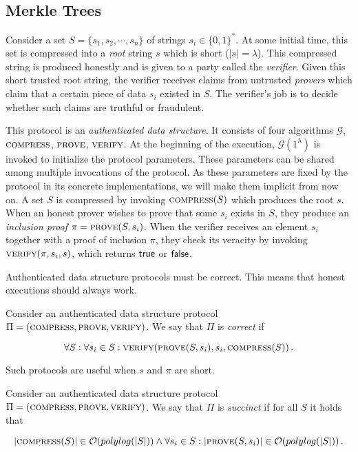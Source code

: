 \subsection{Merkle Trees}
Consider a set $S = \{s_1, s_2, \cdots, s_n\}$ of strings
$s_i \in \{0, 1\}^*$. At some initial time, this set is compressed into a
\emph{root} string $s$ which is short ($|s| = \lambda$). This compressed string
is produced honestly and is given to a party called the \emph{verifier}. Given
this short trusted root string, the verifier receives claims from untrusted
\emph{provers} which claim that a certain piece of data $s_i$ existed in $S$.
The verifier's job is to decide whether such claims are truthful or fraudulent.

This protocol is an \emph{authenticated data structure}. It consists of
four algorithms $\mathcal{G}$, $\textsc{compress}$, $\textsc{prove}$,
$\textsc{verify}$. At the beginning of the execution, $\mathcal{G}(1^\lambda)$
is invoked to initialize the protocol parameters. These parameters can be shared
among multiple invocations of the protocol. As these parameters are fixed by the
protocol in its concrete implementations, we will make them implicit from now
on. A set $S$ is compressed by invoking $\textsc{compress}(S)$
which produces the root $s$. When an honest prover wishes to prove that some
$s_i$ exists in $S$, they produce an \emph{inclusion proof} $\pi =
\textsc{prove}(S, s_i)$. When the verifier receives an element $s_i$ together
with a proof of inclusion $\pi$, they check its veracity by invoking
$\textsc{verify}(\pi, s_i, s)$, which returns $\textsf{true}$ or $\textsf{false}$.

Authenticated data structure protocols must be correct. This means that honest
executions should always work.

\begin{definition}[Correctness]
  Consider an authenticated data structure protocol
  $\Pi = (\textsc{compress}, \textsc{prove}, \textsc{verify})$.
  We say that $\Pi$ is
  \emph{correct} if

  \[\forall S:
    \forall s_i \in S:
    \textsc{verify}(\textsc{prove}(S, s_i), s_i, \textsc{compress}(S))\,.\]
\end{definition}

Such protocols are useful when $s$ and $\pi$ are short.

\begin{definition}[Succinctness]
  Consider an authenticated data structure protocol
  $\Pi = (\textsc{compress}, \textsc{prove}, \textsc{verify})$.
  We say that $\Pi$ is
  \emph{succinct} if
  for all $S$ it holds that

  \[|\textsc{compress}(S)| \in \mathcal{O}(polylog(|S|))
    \land
    \forall s_i \in S:
    |\textsc{prove}(S, s_i)| \in \mathcal{O}(polylog(|S|))
    \,.\]
\end{definition}

